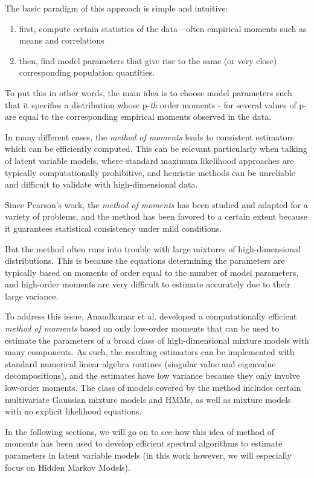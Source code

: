 The basic paradigm of this approach is simple and intuitive:
\begin{enumerate}[label=\roman*]
\item first, compute certain statistics of the data—often empirical moments such as means and correlations
\item then, find model parameters that give rise to the same (or very close) corresponding population quantities.
\end{enumerate}

To put this in other words, the main idea is to choose model parameters such that it specifies a distribution whose p-\textit{th} order moments - for several values of p- are equal to the corresponding empirical moments observed in the data.

In many different cases, the \textit{method of moments} leads to consistent estimators which can be efficiently computed. This can be relevant particularly when talking of latent variable models, where standard maximum likelihood approaches are typically computationally prohibitive, and heuristic methods can be unreliable and difficult to validate with high-dimensional data. 


Since Pearson’s work, the \textit{method of moments} has been studied
and adapted for a variety of problems, and the method has been favored to a certain extent because it guarantees statistical consistency under mild conditions.

But the method often runs into trouble with large mixtures of high-dimensional distributions. This is because the equations determining the parameters are typically based on moments of order equal to the number of model parameters, and high-order moments are very difficult to estimate accurately due to their large variance.

To address this issue, Anandkumar et al. \cite{ref6} developed a computationally efficient \textit{method of moments} based on only low-order moments that can be used to estimate the parameters of a broad class of high-dimensional mixture
models with many components. As such, the resulting estimators can be implemented with standard numerical
linear algebra routines (singular value and eigenvalue decompositions), and the estimates have
low variance because they only involve low-order moments.
The class of models covered by the method includes certain multivariate Gaussian mixture models and HMMs, as well as mixture models with no explicit likelihood equations.

In the following sections, we will go on to see how this idea of method of moments has been used to develop efficient spectral algorithms to estimate parameters in latent variable models (in this work however, we will especially focus on Hidden Markov Models).



